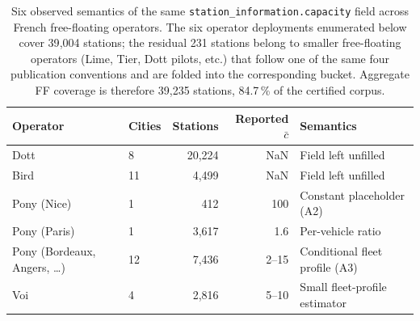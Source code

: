 \documentclass[11pt,a4paper]{article}
\begin{document}
\begin{table}[!htbp]
\centering
\caption{Six observed semantics of the same
\texttt{station\_information.capacity} field across French
free-floating operators. The six operator deployments enumerated
below cover 39{,}004 stations; the residual 231 stations belong to
smaller free-floating operators (Lime, Tier, Dott pilots, etc.) that
follow one of the same four publication conventions and are folded
into the corresponding bucket. Aggregate FF coverage is therefore
39{,}235 stations, 84.7\,\% of the certified corpus.}
\label{tab:capacity-semantics}
\small
\begin{tabular}{@{}llrrl@{}}
\toprule
\textbf{Operator} & \textbf{Cities} & \textbf{Stations} & \textbf{Reported $\bar c$} & \textbf{Semantics}\\
\midrule
Dott         & 8  & 20{,}224 & NaN  & Field left unfilled \\
Bird         & 11 &  4{,}499 & NaN  & Field left unfilled \\
Pony (Nice)  & 1  &     412  & 100  & Constant placeholder (A2) \\
Pony (Paris) & 1  &  3{,}617 & 1.6  & Per-vehicle ratio \\
Pony (Bordeaux, Angers, \dots) & 12 &  7{,}436 & 2--15 & Conditional fleet profile (A3) \\
Voi          & 4  &  2{,}816 & 5--10 & Small fleet-profile estimator \\
\bottomrule
\end{tabular}
\end{table}
\end{document}

